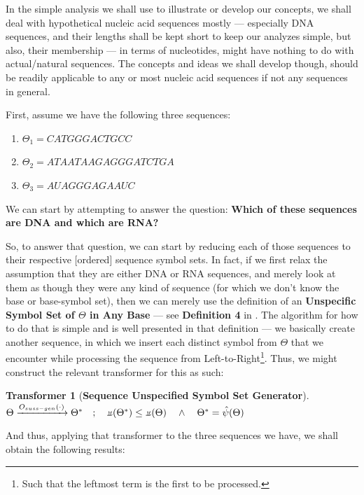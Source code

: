 \documentclass[a4paper, 18pt]{book} %
\newtheorem{transf}{Transformer}
\newcommand{\invpi}{\rotatebox[origin=c]{180}{$\pi$}}
\begin{document}
In the simple analysis we shall use to illustrate or develop our concepts, we shall deal with hypothetical nucleic acid sequences mostly --- especially DNA sequences, and their lengths shall be kept short to keep our analyzes simple, but also, their membership --- in terms of nucleotides, might have nothing to do with actual/natural sequences. The concepts and ideas we shall develop though, should be readily applicable to any or most nucleic acid sequences if not any sequences in general.

First, assume we have the following three sequences:

\begin{enumerate}
\item $\Theta_1 = CATGGGACTGCC$
\item $\Theta_2 = ATAATAAGAGGGATCTGA$
\item $\Theta_3 = AUAGGGAGAAUC$
\end{enumerate}

We can start by attempting to answer the question: \textbf{Which of these sequences are DNA and which are RNA?}

So, to answer that question, we can start by reducing each of those sequences to their respective [ordered] sequence symbol sets. In fact, if we first relax the assumption that they are either DNA or RNA sequences, and merely look at them as though they were any kind of sequence (for which we don't know the base or base-symbol set), then we can merely use the definition of an \textbf{Unspecific Symbol Set of $\Theta$ in Any Base} --- see \textbf{Definition 4} in \cite{ossipaper}. The algorithm for how to do that is simple and is well presented in that definition --- we basically create another sequence, in which we insert each distinct symbol from $\Theta$ that we encounter while processing the sequence from Left-to-Right\footnote{Such that the leftmost term is the first to be processed.}. Thus, we might construct the relevant transformer for this as such:

\begin{transf}[\textbf{Sequence Unspecified Symbol Set Generator}]
\label{TRANSSSGEN}$ $\\
$\Theta \xrightarrow{O_{suss-gen}(\cdot)} \Theta^* \quad;\quad \invpi(\Theta^*) \leq \invpi(\Theta) \quad \land \quad \Theta^* = \hat{\psi}(\Theta)$
\end{transf}

And thus, applying that transformer to the three sequences we have, we shall obtain the following results:
\end{document}
